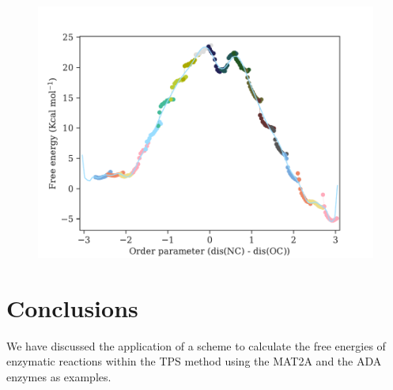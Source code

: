 \documentclass[journal=jpcbfk,manuscript=article,layout=traditional]{achemso}
\begin{document}
\begin{figure}[ht!]
\includegraphics[scale=0.5]{./figures/ada-fenergy.pdf}
\end{figure}

\section{Conclusions}
We have discussed the application of a scheme to calculate the 
free energies of enzymatic reactions within the TPS method using the MAT2A
and the ADA enzymes as examples. 

\begin{acknowledgement}


\end{acknowledgement}
\end{document}
